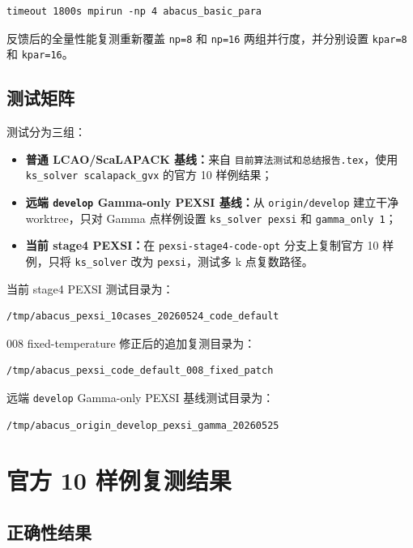 \documentclass[a4paper,11pt]{article}
\newcommand{\code}[1]{\texttt{#1}}
\begin{document}
\begin{verbatim}
timeout 1800s mpirun -np 4 abacus_basic_para
\end{verbatim}

反馈后的全量性能复测重新覆盖 \code{np=8} 和 \code{np=16} 两组并行度，并分别设置 \code{kpar=8} 和 \code{kpar=16}。

\subsection{测试矩阵}

测试分为三组：

\begin{itemize}
    \item \textbf{普通 LCAO/ScaLAPACK 基线：}来自 \code{目前算法测试和总结报告.tex}，使用 \code{ks\_solver scalapack\_gvx} 的官方 10 样例结果；
    \item \textbf{远端 \code{develop} Gamma-only PEXSI 基线：}从 \code{origin/develop} 建立干净 worktree，只对 Gamma 点样例设置 \code{ks\_solver pexsi} 和 \code{gamma\_only 1}；
    \item \textbf{当前 stage4 PEXSI：}在 \code{pexsi-stage4-code-opt} 分支上复制官方 10 样例，只将 \code{ks\_solver} 改为 \code{pexsi}，测试多 k 点复数路径。
\end{itemize}

当前 stage4 PEXSI 测试目录为：

\begin{verbatim}
/tmp/abacus_pexsi_10cases_20260524_code_default
\end{verbatim}

008 fixed-temperature 修正后的追加复测目录为：

\begin{verbatim}
/tmp/abacus_pexsi_code_default_008_fixed_patch
\end{verbatim}

远端 \code{develop} Gamma-only PEXSI 基线测试目录为：

\begin{verbatim}
/tmp/abacus_origin_develop_pexsi_gamma_20260525
\end{verbatim}

\section{官方 10 样例复测结果}

\subsection{正确性结果}
\end{document}
